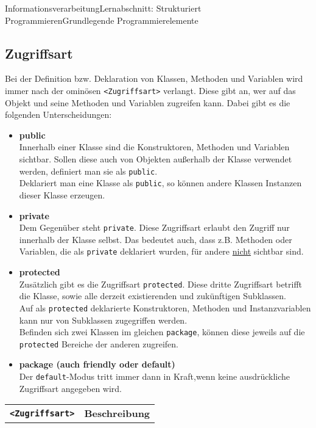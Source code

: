 \documentclass[11pt,oneside,openany,headings=optiontotoc,11pt,numbers=noenddot]{article}
\begin{document}
\begin{worksheet}{Informationsverarbeitung}{Lernabschnitt: Strukturiert Programmieren}{Grundlegende Programmierelemente}
		\subsection{Zugriffsart}
		Bei der Definition bzw. Deklaration von Klassen, Methoden und Variablen wird immer nach der ominösen \lstinline[style=Python]{<Zugriffsart>} verlangt. Diese gibt an, wer auf das Objekt und seine Methoden und Variablen zugreifen kann. Dabei gibt es die folgenden Unterscheidungen:
		\begin{itemize}
			\item \textbf{public}\\
			Innerhalb einer Klasse sind die Konstruktoren, Methoden und Variablen sichtbar. Sollen diese auch von Objekten außerhalb der Klasse verwendet werden, definiert man sie als \lstinline[style=Python]{public}.\\
			Deklariert man eine Klasse als \lstinline[style=Python]{public}, so können andere Klassen Instanzen dieser Klasse erzeugen.
			\item \textbf{private}\\
			Dem Gegenüber steht \lstinline[style=Python]{private}. Diese Zugriffsart erlaubt den Zugriff nur innerhalb der Klasse selbst. Das bedeutet auch, dass z.B. Methoden oder Variablen, die als \lstinline[style=Python]{private} deklariert wurden, für andere \underline{nicht} sichtbar sind.
			\item \textbf{protected}\\
			Zusätzlich gibt es die Zugriffsart \lstinline[style=Python]{protected}. Diese dritte Zugriffsart betrifft die Klasse, sowie alle derzeit existierenden und zukünftigen Subklassen.\\
			Auf als \lstinline[style=Python]{protected} deklarierte Konstruktoren, Methoden und Instanzvariablen kann nur von Subklassen zugegriffen werden.\\
			Befinden sich zwei Klassen im gleichen \lstinline[style=Python]{package}, können diese jeweils auf die \lstinline[style=Python]{protected} Bereiche der anderen zugreifen.
			\item \textbf{package (auch friendly oder default)}\\			
			Der \lstinline[style=Python]{default}-Modus tritt immer dann in Kraft,wenn keine ausdrückliche Zugriffsart angegeben wird.\\
		\end{itemize}
		\begin{tabularx}{\textwidth}{cX}
			\textbf{{\lstinline[style=Python]{<Zugriffsart>}}} & \textbf{Beschreibung}\\

\end{tabularx}
\end{worksheet}
\end{document}
